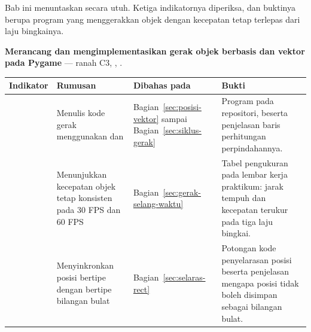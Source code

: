 \begin{subcpmkbox}
Bab ini menuntaskan  secara utuh. Ketiga indikatornya diperiksa,
dan buktinya berupa program yang menggerakkan objek dengan kecepatan tetap
terlepas dari laju bingkainya.

\vspace{0.5em}
\textbf{ Merancang dan mengimplementasikan gerak objek berbasis
 dan vektor pada Pygame} --- ranah C3, ,
.

\vspace{0.5em}
{\setlength{\tabcolsep}{4pt}\footnotesize%
\begin{tabularx}{\textwidth}{@{}C{1.9cm} L{4.0cm} L{2.5cm} Y@{}}
\toprule
\headrow \textbf{Indikator} & \textbf{Rumusan} & \textbf{Dibahas pada} & \textbf{Bukti} \\
\midrule
{} & Menulis kode gerak menggunakan  dan
 &
Bagian~\ref{sec:posisi-vektor} sampai Bagian~\ref{sec:siklus-gerak} &
Program  pada repositori, beserta penjelasan baris
perhitungan perpindahannya. \\
\addlinespace
{} & Menunjukkan kecepatan objek tetap konsisten pada 30 FPS dan 60 FPS &
Bagian~\ref{sec:gerak-selang-waktu} &
Tabel pengukuran pada lembar kerja praktikum: jarak tempuh dan kecepatan
terukur pada tiga laju bingkai. \\
\addlinespace
{} & Menyinkronkan posisi bertipe  dengan 
bertipe bilangan bulat &
Bagian~\ref{sec:selaras-rect} &
Potongan kode penyelarasan posisi beserta penjelasan mengapa posisi tidak boleh
disimpan sebagai bilangan bulat. \\
\bottomrule
\end{tabularx}}
\end{subcpmkbox}
